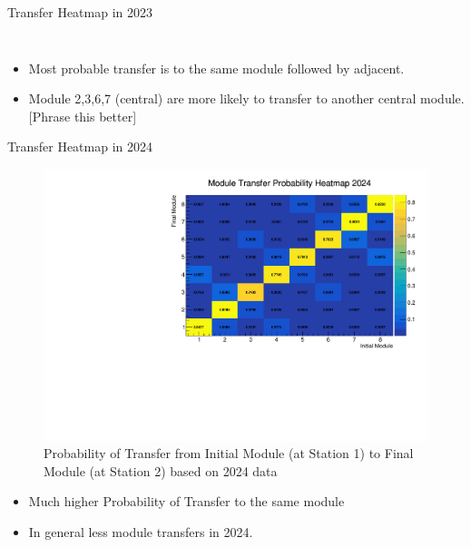 \begin{frame}{Transfer Heatmap in 2023}
\begin{columns}
\begin{column}{0.2\linewidth}
\begin{figure}
            \end{figure}
        \end{column}
    \end{columns}
    \begin{itemize}
        \small
        \item Most probable transfer is to the same module followed by adjacent.
        \item Module 2,3,6,7 (central) are more likely to transfer to another central module. [Phrase this better]
    \end{itemize}
\end{frame}

\begin{frame}{Transfer Heatmap in 2024}
    \begin{figure}
        \includegraphics[width=0.8\linewidth]{./ModuleLevelPlots/st0_module_number vs st1_module_number_prob_2024.pdf}
        \caption{Probability of Transfer from Initial Module (at Station 1) to Final Module (at Station 2) based on 2024 data}
    \end{figure}
    \begin{itemize}
        \small
        \item Much higher Probability of Transfer to the same module
        \item In general less module transfers in 2024.
    \end{itemize}
\end{frame}

